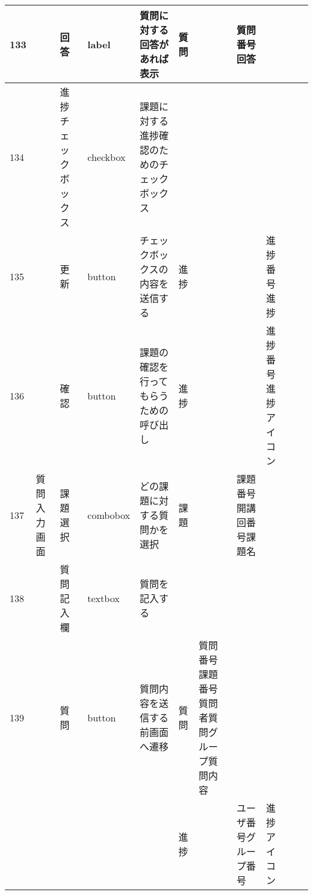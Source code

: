 \begin{table}[]
\begin{tabular}{|l|l|l|l|l|l|l|l|l|l|l|}
133 &               & 回答               & label    & 質問に対する回答があれば表示                                                    & 質問      &                       & 質問番号回答             &                 &                               &                                                                \\ \hline
134 &               & 進捗チェックボックス       & checkbox & 課題に対する進捗確認のためのチェックボックス                                            &         &                       &                    &                 &                               &                                                                \\ \hline
135 &               & 更新               & button   & チェックボックスの内容を送信する                                                  & 進捗      &                       &                    & 進捗番号進捗          &                               &                                                                \\ \hline
136 &               & 確認               & button   & 課題の確認を行ってもらうための呼び出し                                               & 進捗      &                       &                    & 進捗番号進捗アイコン      &                               &                                                                \\ \hline
137 & 質問入力画面        & 課題選択             & combobox & どの課題に対する質問かを選択                                                    & 課題      &                       & 課題番号開講回番号課題名       &                 &                               &                                                                \\ \hline
138 &               & 質問記入欄            & textbox  & 質問を記入する                                                           &         &                       &                    &                 &                               &                                                                \\ \hline
139 &               & 質問               & button   & 質問内容を送信する前画面へ遷移                                                   & 質問      & 質問番号課題番号質問者質問グループ質問内容 &                    &                 &                               &                                                                \\ \hline
    &               &                  &          &                                                                   & 進捗      &                       & ユーザ番号グループ番号        & 進捗アイコン          &                               &                                                                \\ \hline

\end{tabular}
\end{table}
